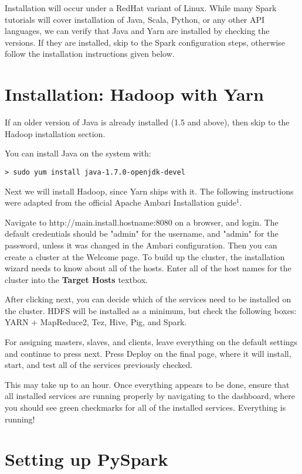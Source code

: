 \documentclass[9pt,twocolumn,twoside]{idsi}
\begin{document}
Installation will occur under a RedHat variant of Linux. While many Spark tutorials will cover installation of Java, Scala, Python, or any other API languages, we can verify that Java and Yarn are installed by checking the versions. If they are installed, skip to the Spark configuration steps, otherwise follow the installation instructions given below.

\section{Installation: Hadoop with Yarn}
If an older version of Java is already installed (1.5 and above), then skip to the Hadoop installation section.

\noindent
You can install Java on the system with:
\begin{verbatim}
> sudo yum install java-1.7.0-openjdk-devel
\end{verbatim}

\noindent
Next we will install Hadoop, since Yarn ships with it. The following instructions were adapted from the official Apache Ambari Installation guide$^1$.

Navigate to http://{main.install.hostname}:8080 on a browser, and login. The default credentials should be "admin" for the username, and "admin" for the password, unless it was changed in the Ambari configuration.
Then you can create a cluster at the Welcome page. To build up the cluster, the installation wizard needs to know about all of the hosts. Enter all of the host names for the cluster into the \textbf{Target Hosts} textbox.

After clicking next, you can decide which of the services need to be installed on the cluster. HDFS will be installed as a minimum, but check the following boxes: YARN + MapReduce2, Tez, Hive, Pig, and Spark.

For assigning masters, slaves, and clients, leave everything on the default settings and continue to press next. Press Deploy on the final page, where it will install, start, and test all of the services previously checked. 

This may take up to an hour. Once everything appears to be done, ensure that all installed services are running properly by navigating to the dashboard, where you should see green checkmarks for all of the installed services. Everything is running!

\section{Setting up PySpark}
\end{document}
